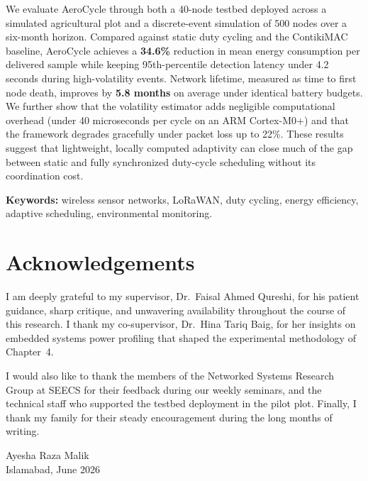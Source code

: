 \documentclass[12pt,a4paper]{report}
\begin{document}
We evaluate AeroCycle through both a 40-node testbed deployed across a simulated agricultural
plot and a discrete-event simulation of 500 nodes over a six-month horizon. Compared against
static duty cycling and the ContikiMAC baseline, AeroCycle achieves a \textbf{34.6\%} reduction
in mean energy consumption per delivered sample while keeping 95th-percentile detection
latency under 4.2 seconds during high-volatility events. Network lifetime, measured as time
to first node death, improves by \textbf{5.8 months} on average under identical battery
budgets. We further show that the volatility estimator adds negligible computational overhead
(under 40 microseconds per cycle on an ARM Cortex-M0+) and that the framework degrades
gracefully under packet loss up to 22\%. These results suggest that lightweight, locally
computed adaptivity can close much of the gap between static and fully synchronized duty-cycle
scheduling without its coordination cost.

\vspace{10pt}
\noindent\textbf{Keywords:} wireless sensor networks, LoRaWAN, duty cycling, energy efficiency,
adaptive scheduling, environmental monitoring.

\chapter*{Acknowledgements}
\thispagestyle{plain}

\noindent I am deeply grateful to my supervisor, Dr.\ Faisal Ahmed Qureshi, for his patient
guidance, sharp critique, and unwavering availability throughout the course of this research.
I thank my co-supervisor, Dr.\ Hina Tariq Baig, for her insights on embedded systems power
profiling that shaped the experimental methodology of Chapter~4.

I would also like to thank the members of the Networked Systems Research Group at SEECS for
their feedback during our weekly seminars, and the technical staff who supported the testbed
deployment in the pilot plot. Finally, I thank my family for their steady encouragement during
the long months of writing.

\vspace{20pt}
\begin{flushright}
Ayesha Raza Malik\\
Islamabad, June 2026
\end{flushright}
\end{document}
